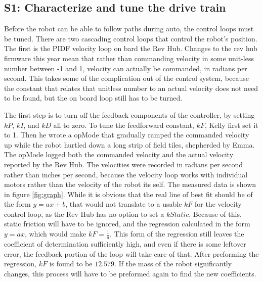 \documentclass{article}
\begin{document}
\subsection{S1: Characterize and tune the drive train}


Before the robot can be able to follow paths during auto, the control loops must be tuned. There are two cascading control loops that control the robot's position. The first is the PIDF velocity loop on bard the Rev Hub. Changes to the rev hub firmware this year mean that rather than commanding velocity in some unit-less number between -1 and 1, velocity can actually be commanded, in radians per second. This takes some of the complication out of the control system, because the constant that relates that unitless number to an actual velocity does not need to be found, but the on board loop still has to be turned. 

The first step is to turn off the feedback components of the controller, by setting $kP$, $kI$, and $kD$ all to zero. To tune the feedforward constant, $kF$, Kelly first set it to 1. Then he wrote a opMode that gradually ramped the commanded velocity up while the robot hurtled down a long strip of field tiles, shepherded by Emma. The opMode logged both the commanded velocity and the actual velocity reported by the Rev Hub. The velocities were recorded in radians per second rather than inches per second, because the velocity loop works with individual motors rather than the velocity of the robot its self. The measured data is shown in figure \ref{fig:graph}. While it is obvious that the real line of best fit should be of the form $y=ax+b$, that would not translate to a usable $kF$ for the velocity control loop, as the Rev Hub has no option to set a $kStatic$. Because of this, static friction will have to be ignored, and the regression calculated in the form $y=ax$, which would make $kF = \frac{1}{a}$. This form of the regression still leaves the coefficient of determination sufficiently high, and even if there is some leftover error, the feedback portion of the loop will take care of that. After preforming the regression, $kF$ is found to be $12.579$. If the mass of the robot significantly changes, this process will have to be preformed again to find the new coefficients.
\end{document}
